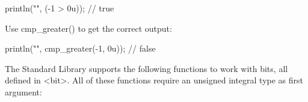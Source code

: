 \begin{cpp}
println("{}", (-1 > 0u)); // true
\end{cpp}

Use cmp\_greater() to get the correct output:

\begin{cpp}
println("{}", cmp_greater(-1, 0u)); // false
\end{cpp}




The Standard Library supports the following functions to work with bits, all defined in <bit>. All of these functions require an unsigned integral type as first argument:


